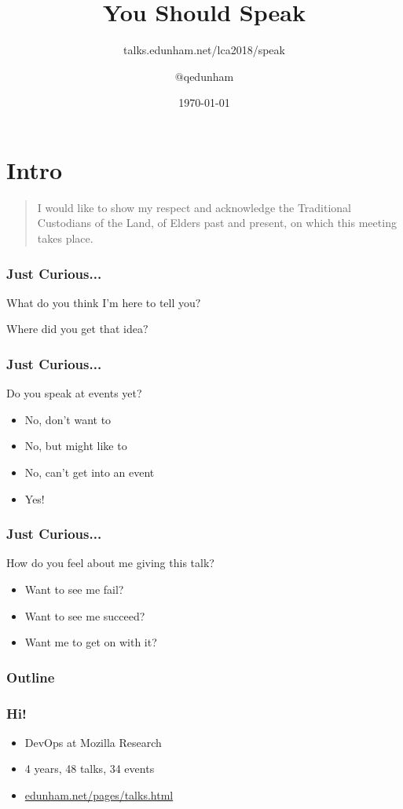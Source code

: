 \documentclass{beamer}
\title{You Should Speak}
\subtitle{talks.edunham.net/lca2018/speak}
\author{$@$qedunham}
\institute{LinuxConf Australia}
\date{\today}
\begin{document}
\begin{frame}[fragile]
\titlepage
\end{frame}

\section{Intro}

\begin{frame}[fragile]
\begin{quote}
I would like to show my respect and acknowledge the Traditional
Custodians of the Land, of Elders past and present, on which this meeting
takes place.
\end{quote}
\end{frame}

\begin{frame}[fragile]
\frametitle{Just Curious...}
What do you think I'm here to tell you$?$

Where did you get that idea$?$
\end{frame}
\begin{frame}[fragile]
\frametitle{Just Curious...}
Do you speak at events yet?
\begin{itemize}
\item No, don't want to
\item No, but might like to
\item No, can't get into an event
\item Yes!
\end{itemize}
\end{frame}

\begin{frame}[fragile]
\frametitle{Just Curious...}
How do you feel about me giving this talk?
\begin{itemize}
\item Want to see me fail?
\item Want to see me succeed?
\item Want me to get on with it?
\end{itemize}
\end{frame}
\begin{frame}[fragile]
\frametitle{Outline}
\tableofcontents[]
\end{frame}

\begin{frame}[fragile]
\frametitle{Hi!}
\begin{itemize}
\item DevOps at Mozilla Research
\item 4 years, 48 talks, 34 events
\item \url{edunham.net/pages/talks.html}
\end{itemize}
\end{frame}
\end{document}
